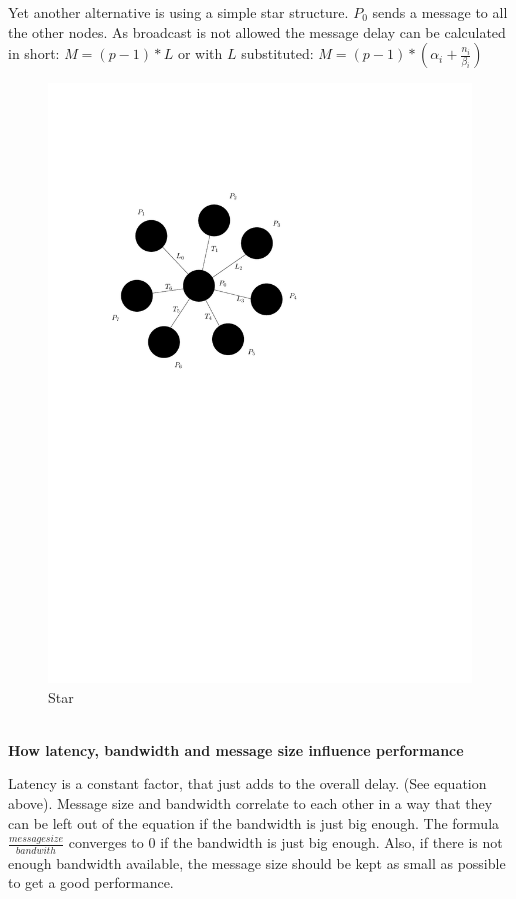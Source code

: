 \documentclass[a4paper,twoside,11pt]{article}
\begin{document}
Yet another alternative is using a simple star structure.
$P_0$ sends a message to all the other nodes.
As broadcast is not allowed the message delay can be calculated in short: \mbox{$M = (p-1)*L$} or with $L$ substituted: $M = (p-1) * (\alpha_i + \frac{n_i}{\beta_i})$
\begin{figure}[!htbp]
    \begin{center}
        \includegraphics[scale=1]{3c_3.pdf}
    \end{center}
    \caption{Star}
    \label{Star}
\end{figure}



$ $ \\
\textbf{How latency, bandwidth and message size influence performance}

\hspace{1em}Latency is a constant factor, that just adds to the overall delay. (See equation above). Message size and bandwidth correlate to each other in a way that they can be left out of the equation if the bandwidth is just big enough.
The formula $\frac{messagesize}{bandwith}$ converges to 0 if the bandwidth is just big enough. Also, if there is not enough bandwidth available, the message size should be kept as small as possible to get a good performance.
\end{document}
